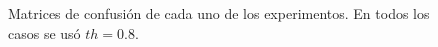 \begin{figure}
	\caption{ Matrices de confusión de cada uno de los experimentos. En todos los casos se usó $th=0.8$.} \label{fig:cm-comparison}
\end{figure} 

